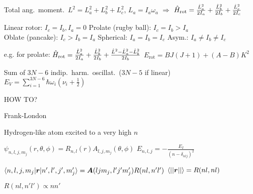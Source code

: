 \begin{squishlist}
    \item Total ang.\ moment.\ $L^2 = L_a^2 + L_b^2 + L_c^2$, \quad $L_a = I_a \omega_a$ \quad $\Rightarrow$  \quad$\hat{H}_{\text{rot}} = \frac{\hat{L}_a^2}{2I_a} + \frac{\hat{L}_b^2}{2I_b} + \frac{\hat{L}_c^2}{2I_c}$
    \item Linear rotor: $I_c = I_b, I_a=0$ \quad Prolate (rugby ball): $I_c = I_b > I_a$  \\
    Oblate (pancake): $I_c > I_b = I_a$ \quad Spherical: $I_a = I_b=I_c$ \quad Asym.:  $I_a \neq I_b \neq I_c$
    \item     \item e.g. for prolate: $\hat{H}_{\text{rot}} = \frac{\hat{L}_a^2}{2I_a} + \frac{\hat{L}_b^2}{2I_b} + \frac{\hat{L}^2 - \hat{L}_a^2 - \hat{L}_b^2}{2I_b} $ \quad $E_{\text{rot}} = B J(J+1) + (A - B)K^2$
\end{squishlist}

\begin{squishlist}
    \item Sum of $3N-6$ indip.\ harm.\ oscillat.\ ($3N-5$ if linear) \quad $E_V = \sum_{i=1}^{3N-6} \hbar \omega_i (\nu_i + \frac{1}{2})$
    \item HOW TO?
    \item Frank-London
\end{squishlist}

Hydrogen-like atom excited to a very high $n$
\begin{squishlist}
    \item $\psi_{n,l,j,m_j}(r,\theta, \phi) = R_{n,l}(r) A_{l,j,m_j}(\theta,\phi)$ \quad $E_{n,l,j} = - \frac{E_I}{(n - \delta_{nlj})^2}$
    \item $\braket{n,l,j,m_j|\bm{r}|n',l',j',m_j'} = \bm{A}(ljm_j, l'j'm_j')R(nl,n'l')$ \quad $\braket{||\bm{r}||} = R(nl,nl)$
    \item $R(nl,n'l') \propto nn'$
\end{squishlist}




